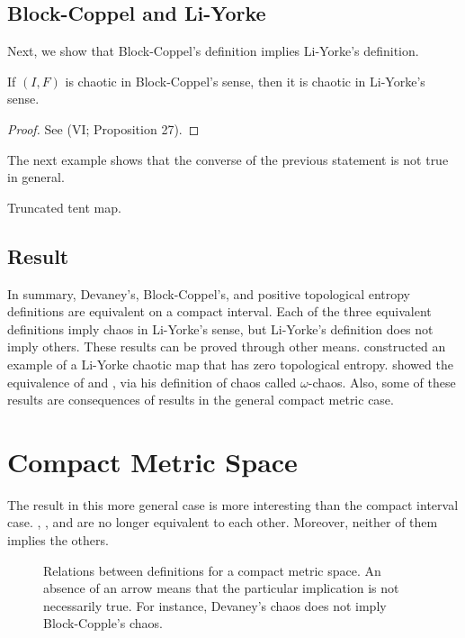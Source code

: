 \documentclass[12pt,twoside,draft]{book}
\begin{document}
\subsection*{Block-Coppel and Li-Yorke}
Next, we show that Block-Coppel's definition implies Li-Yorke's definition.
\begin{theorem}
  \citep{blockcoppel}
  If $(I,F)$ is chaotic in Block-Coppel's sense, then it is chaotic in Li-Yorke's sense.
  \label{thm:devaney-liyorke}
  \begin{proof}
    See \citet{blockcoppel} (VI; Proposition 27).
  \end{proof}
\end{theorem}
The next example shows that the converse of the previous statement is not true in general.
\begin{example}
  \citep{blockcoppel}
  Truncated tent map.
  \label{eg:counterexample}
\end{example}

\subsection*{Result}
In summary, Devaney's, Block-Coppel's, and positive topological entropy definitions are equivalent on a compact interval.
Each of the three equivalent definitions imply chaos in Li-Yorke's sense, but Li-Yorke's definition does not imply others.
These results can be proved through other means.
\citet{smital} constructed an example of a Li-Yorke chaotic map that has zero topological entropy.
\citet{omegachaos} showed the equivalence of \dev and \pte, via his definition of chaos called $\omega$-chaos.
Also, some of these results are consequences of results in the general compact metric case.

\section{Compact Metric Space}
The result in this more general case is more interesting than the compact interval case.
\dev, \blcp, and \pte are no longer equivalent to each other.
Moreover, neither of them implies the others.
\begin{figure}[ht]
  \label{fig:chaos-metric}
  \caption{
    Relations between definitions for a compact metric space.
    An absence of an arrow means that the particular implication is not necessarily true.
    For instance, Devaney's chaos does not imply Block-Copple's chaos.
  }
\end{figure}
\end{document}
